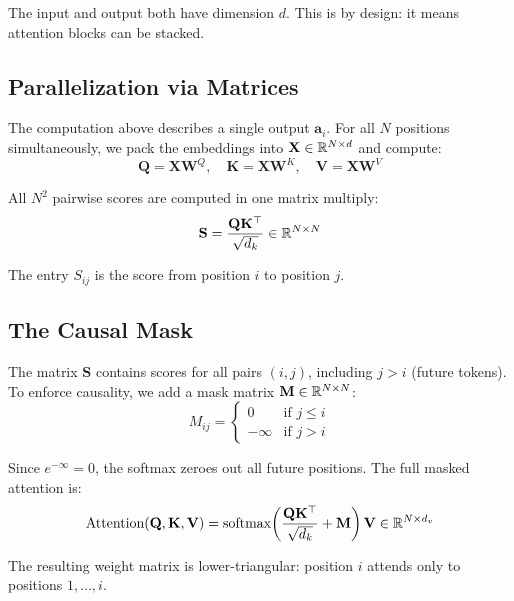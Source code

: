 \documentclass[main.tex]{subfiles}
\begin{document}
The input and output both have dimension $d$. This is by design: it means attention blocks can be stacked.

\subsection{Parallelization via Matrices}

The computation above describes a single output $\mathbf{a}_i$. For all $N$ positions simultaneously, we pack the embeddings into $\mathbf{X} \in \mathbb{R}^{N \times d}$ and compute:
$$\mathbf{Q} = \mathbf{X}\mathbf{W}^Q, \quad \mathbf{K} = \mathbf{X}\mathbf{W}^K, \quad \mathbf{V} = \mathbf{X}\mathbf{W}^V$$

All $N^2$ pairwise scores are computed in one matrix multiply:
$$\mathbf{S} = \frac{\mathbf{Q}\mathbf{K}^\top}{\sqrt{d_k}} \in \mathbb{R}^{N \times N}$$

The entry $S_{ij}$ is the score from position $i$ to position $j$.

\subsection{The Causal Mask}

The matrix $\mathbf{S}$ contains scores for all pairs $(i,j)$, including $j > i$ (future tokens). To enforce causality, we add a mask matrix $\mathbf{M} \in \mathbb{R}^{N \times N}$:
$$M_{ij} = \begin{cases} 0 & \text{if } j \leq i \\ -\infty & \text{if } j > i \end{cases}$$

Since $e^{-\infty} = 0$, the softmax zeroes out all future positions. The full masked attention is:
$$\text{Attention}(\mathbf{Q}, \mathbf{K}, \mathbf{V}) = \text{softmax}\!\left(\frac{\mathbf{Q}\mathbf{K}^\top}{\sqrt{d_k}} + \mathbf{M}\right) \mathbf{V} \in \mathbb{R}^{N \times d_v}$$

The resulting weight matrix is lower-triangular: position $i$ attends only to positions $1, \ldots, i$.
\end{document}
